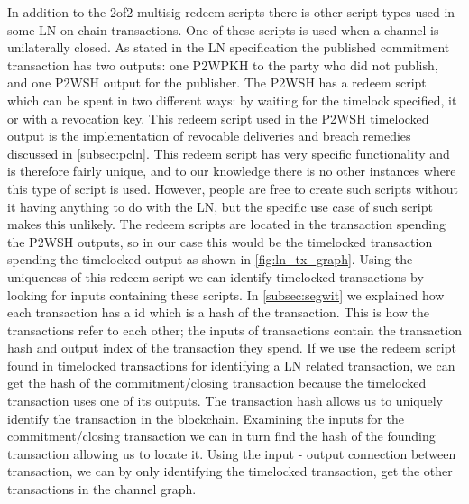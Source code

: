 In addition to the 2of2 multisig redeem scripts there is other script types used in some LN on-chain transactions. One of these scripts is used when a channel is unilaterally closed. As stated in the LN specification \cite{bolt3} the published commitment transaction has two outputs: one P2WPKH to the party who did not publish, and one P2WSH output for the publisher.
The P2WSH has a redeem script which can be spent in two different ways: by waiting for the timelock specified, it or with a revocation key. This redeem script used in the P2WSH timelocked output is the implementation of revocable deliveries and breach remedies discussed in \cref{subsec:pcln}.
This redeem script has very specific functionality and is therefore fairly unique, and to our knowledge there is no other instances where this type of script is used. However, people are free to create such scripts without it having anything to do with the LN, but the specific use case of such script makes this unlikely. The redeem scripts are located in the transaction spending the P2WSH outputs, so in our case this would be the timelocked transaction spending the timelocked output as shown in \cref{fig:ln_tx_graph}. Using the uniqueness of this redeem script we can identify timelocked transactions by looking for inputs containing these scripts. 
In \cref{subsec:segwit} we explained how each transaction has a id which is a hash of the transaction. This is how the transactions refer to each other; the inputs of transactions contain the transaction hash and output index of the transaction they spend. If we use the redeem script found in timelocked transactions for identifying a LN related transaction, we can get the hash of the commitment/closing transaction because the timelocked transaction uses one of its outputs. The transaction hash allows us to uniquely identify the transaction in the blockchain. Examining the inputs for the commitment/closing transaction we can in turn find the hash of the founding transaction allowing us to locate it. Using the input - output connection between transaction, we can by only identifying the timelocked transaction, get the other transactions in the channel graph. 
\\


